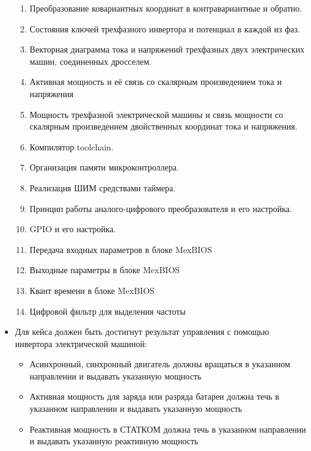 \begin{itemize}
\begin{enumerate}
\item Преобразование ковариантных координат в контравариантные и обратно.
\item Состояния ключей трехфазного инвертора и потенциал в каждой из фаз.
\item Векторная диаграмма тока и напряжений трехфазных двух электрических машин, соединенных дросселем.
\item Активная мощность и её связь со скалярным произведением тока и напряжения
\item Мощность трехфазной электрической машины и связь мощности со скалярным произведением двойственных координат тока и напряжения.
\item Компилятор toolchain.
\item Организация памяти микроконтроллера.
\item Реализация ШИМ средствами таймера.
\item Принцип работы аналого-цифрового преобразователя и его настройка.
\item GPIO и его настройка.
\item Передача входных параметров в блоке MexBIOS
\item Выходные параметры в блоке MexBIOS
\item Квант времени в блоке MexBIOS
\item Цифровой фильтр для выделения частоты

\end{enumerate}

\newpage
\item Для кейса должен быть достигнут результат управления с помощью инвертора электрической машиной:
\begin{itemize}
            \item Асинхронный, синхронный двигатель должны вращаться в указанном направлении и выдавать указанную мощность
            \item Активная мощность для заряда или разряда батареи должна течь в указанном направлении и выдавать указанную мощность
            \item Реактивная мощность в СТАТКОМ должна течь в указанном направлении  и выдавать указанную реактивную мощность
\end{itemize}
\end{itemize}

